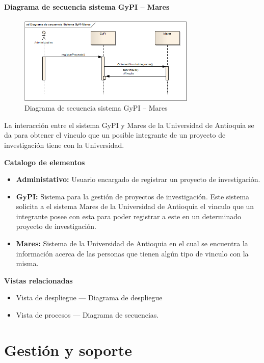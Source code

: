 \documentclass[12pt,oneside,letterpaper]{report}
\begin{document}
\subsubsection{Diagrama de secuencia sistema GyPI – Mares}

\begin{figure}[h!]
  \centering
    \includegraphics[width=0.75\textwidth]{./img/img23.png}
  \caption{Diagrama de secuencia sistema GyPI – Mares}
\end{figure}

La interacción entre el sistema GyPI y Mares de la Universidad de Antioquia se da para obtener el vinculo que un posible integrante de un proyecto de investigación tiene con la Universidad.

\textbf{Catalogo de elementos}

\begin{itemize}
 \item \textbf{Administativo:} Usuario encargado de registrar un proyecto de investigación.
 \item \textbf{GyPI:} Sistema para la gestión de proyectos de investigación. Este sistema solicita a el sistema Mares de la Universidad de Antioquia el vinculo que un integrante posee con esta para poder registrar a este en un determinado proyecto de investigación.
 \item \textbf{Mares:} Sistema de la Universidad de Antioquia en el cual se encuentra la información acerca de las personas que tienen algún tipo de vinculo con la misma.
\end{itemize}

\textbf{Vistas relacionadas}
\begin{itemize}
 \item Vista de despliegue --- Diagrama de despliegue
 \item Vista de procesos --- Diagrama de secuencias.
\end{itemize}


\chapter{Gestión y soporte}
\end{document}
